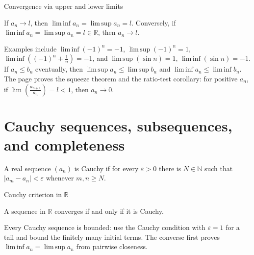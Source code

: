 \begin{theorem}{Convergence via upper and lower limits}

If \(a_{n}\rightarrow l\), then \(\operatorname{lim\, inf}a_{n} = \operatorname{lim\, sup}a_{n} = l\). Conversely, if \(\operatorname{lim\, inf}a_{n} = \operatorname{lim\, sup}a_{n} = l \in \mathbb{R}\), then \(a_{n}\rightarrow l\).

\end{theorem}

Examples include \({\operatorname{lim\, inf}\left( {- 1} \right)}^{n} = - 1\), \({\operatorname{lim\, sup}\left( {- 1} \right)}^{n} = 1\), \(\operatorname{lim\, inf}\left( {\left( {- 1} \right)^{n} + \frac{1}{n}} \right) = - 1\), and \(\operatorname{lim\, sup}\left( {\sin n} \right) = 1\), \(\operatorname{lim\, inf}\left( {\sin n} \right) = - 1\). If \(a_{n} \leq b_{n}\) eventually, then \(\operatorname{lim\, sup}a_{n} \leq \operatorname{lim\, sup}b_{n}\) and \(\operatorname{lim\, inf}a_{n} \leq \operatorname{lim\, inf}b_{n}\). The page proves the squeeze theorem and the ratio-test corollary: for positive \(a_{n}\), if \(\lim\left( \frac{a_{n + 1}}{a_{n}} \right) = l < 1\), then \(a_{n}\rightarrow 0\).

\section{Cauchy sequences, subsequences, and completeness}

\begin{definition}{}

A real sequence \(\left( a_{n} \right)\) is Cauchy if for every \(\varepsilon > 0\) there is \(N \in \mathbb{N}\) such that \(\left| {a_{m} - a_{n}} \right| < \varepsilon\) whenever \(m,n \geq N\).

\end{definition}

\begin{theorem}{Cauchy criterion in \(\mathbb{R}\)}

A sequence in \(\mathbb{R}\) converges if and only if it is Cauchy.

\end{theorem}

Every Cauchy sequence is bounded: use the Cauchy condition with \(\varepsilon = 1\) for a tail and bound the finitely many initial terms. The converse first proves \(\operatorname{lim\, inf}a_{n} = \operatorname{lim\, sup}a_{n}\) from pairwise closeness.

